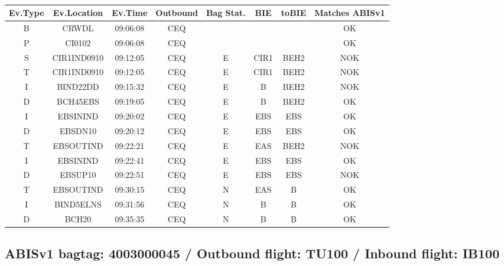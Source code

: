 \documentclass{report}
\begin{document}
\paragraph{}
\begin{longtable}{cccccccc}    \toprule
\rowcolor{white!50}
\textbf{Ev.Type} & \textbf{Ev.Location} & \textbf{Ev.Time} & \textbf{Outbound} & \textbf{Bag Stat.} & \textbf{BIE} & \textbf{toBIE} & \textbf{Matches ABISv1} \\\midrule
B & CRWDL & 09:06:08  & CEQ &  &  &  & OK\\
P & CI0102 & 09:06:08  & CEQ &  &  &  & OK\\
S & CIR1IND0910 & 09:12:05  & CEQ & E & CIR1 & BEH2 & NOK\\
T & CIR1IND0910 & 09:12:05  & CEQ & E & CIR1 & BEH2 & NOK\\
I & BIND22DD & 09:15:32  & CEQ & E & B & BEH2 & NOK\\
D & BCH45EBS & 09:19:05  & CEQ & E & B & BEH2 & OK\\
I & EBSININD & 09:20:02  & CEQ & E & EBS & EBS & OK\\
D & EBSDN10 & 09:20:12  & CEQ & E & EBS & EBS & OK\\
T & EBSOUTIND & 09:22:21  & CEQ & E & EAS & BEH2 & NOK\\
I & EBSININD & 09:22:41  & CEQ & E & EBS & EBS & OK\\
D & EBSUP10 & 09:22:51  & CEQ & E & EBS & EBS & NOK\\
T & EBSOUTIND & 09:30:15  & CEQ & N & EAS & B & OK\\
I & BIND5ELNS & 09:31:56  & CEQ & N & B & B & OK\\
D & BCH20 & 09:35:35  & CEQ & N & B & B & OK\\
\bottomrule
\end{longtable}
\subsection*{ABISv1 bagtag: 4003000045 / Outbound flight: TU100 / Inbound flight: IB100}
\end{document}
